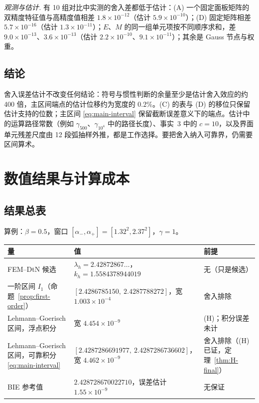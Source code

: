 \documentclass[11pt,a4paper,fontset=fandol]{ctexart}
\begin{document}
\emph{观测与估计.} 有 10 组对比中实测的舍入差都低于估计：(A) 一个固定面板矩阵的双精度特征值与高精度值相差 $1.8\times10^{-12}$（估计 $5.9\times10^{-10}$）；(D) 固定矩阵相差 $5.7\times10^{-16}$（估计 $1.3\times10^{-11}$）；$E$、$M$ 的同一组单元项按不同顺序求和，差 $9.0\times10^{-13}$、$3.6\times10^{-13}$（估计 $2.2\times10^{-10}$、$9.1\times10^{-11}$）；其余是 Gauss 节点与权重。

\subsection{结论}

舍入误差估计不改变任何结论：符号与惯性判断的余量至少是估计舍入效应的约 400 倍，主区间端点的估计位移约为宽度的 $0.2\%$。(C) 的表与 (D) 的移位只保留估计支持的位数；主区间 \eqref{eq:main-interval} 保留截断误差意义下的端点。估计中的运算路径常数（例如 $\gamma_{500}$、$\gamma_{10^4}$ 中的路径长度）、事实~3 中的 $c=10$，以及界面单元残差尺度由 12 段弧抽样外推，都是工作选择。要把舍入纳入可靠界，仍需要区间算术。

\section{数值结果与计算成本}
\label{sec:results}
\subsection{结果总表}

算例：$\beta=0.5$，窗口 $[\alpha_-,\alpha_+]=[1.32^2,2.37^2]$，$\gamma=1$。

\begin{center}
\small
\begin{tabular}{>{\raggedright\arraybackslash}p{4.4cm}>{\raggedright\arraybackslash}p{5.8cm}>{\raggedright\arraybackslash}p{3.4cm}}
\toprule
量 & 值 & 前提 \\
\midrule
FEM--DtN 候选 & $\lambda_h=2.42872867\ldots$，$k_h=1.5584378944019$ & 无（只是候选） \\
一阶区间 $I_1$（命题~\ref{prop:first-order}） & $[2.4286785150,\ 2.4287788272]$，宽 $1.003\times10^{-4}$ & 舍入排除 \\
Lehmann--Goerisch 区间，浮点积分 & 宽 $4.454\times10^{-9}$ & (H)；积分误差未计 \\
Lehmann--Goerisch 区间，可靠积分 \eqref{eq:main-interval} & $[2.4287286691977,\ 2.4287286736602]$，宽 $4.462\times10^{-9}$ & 舍入排除（(H) 已证，定理~\ref{thm:H-final}） \\
BIE 参考值 & $2.428728670022710$，误差估计 $1.55\times10^{-9}$ & 无保证 \\
\bottomrule
\end{tabular}
\end{center}
\end{document}
